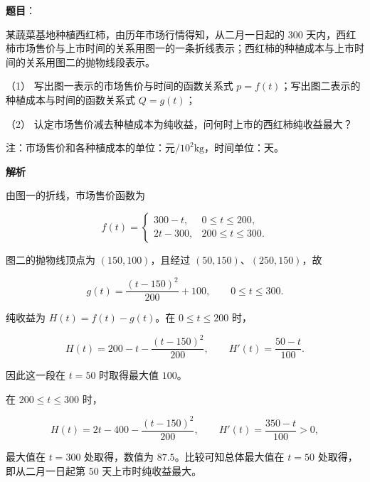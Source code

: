 \begin{answer}

\textbf{题目}：

某蔬菜基地种植西红柿，由历年市场行情得知，从二月一日起的 300 天内，西红柿市场售价与上市时间的关系用图一的一条折线表示；西红柿的种植成本与上市时间的关系用图二的抛物线段表示。

（1） 写出图一表示的市场售价与时间的函数关系式 $p=f(t)$；写出图二表示的种植成本与时间的函数关系式 $Q=g(t)$；

（2） 认定市场售价减去种植成本为纯收益，问何时上市的西红柿纯收益最大？

注：市场售价和各种植成本的单位：元/$10^2\mathrm{kg}$，时间单位：天。
\nopagebreak[4]
\begin{center}\end{center}
\nopagebreak[4]
\textbf{解析}


由图一的折线，市场售价函数为

\nopagebreak[4]
\[
f(t)=
\begin{cases}
300-t,&0\le t\le200,\\
2t-300,&200\le t\le300.
\end{cases}
\]

图二的抛物线顶点为 $(150,100)$，且经过 $(50,150)$、$(250,150)$，故

\nopagebreak[4]
\[
g(t)=\frac{(t-150)^2}{200}+100,
\qquad0\le t\le300.
\]


纯收益为 $H(t)=f(t)-g(t)$。在 $0\le t\le200$ 时，

\nopagebreak[4]
\[
H(t)=200-t-\frac{(t-150)^2}{200},
\qquad
H'(t)=\frac{50-t}{100}.
\]

因此这一段在 $t=50$ 时取得最大值 $100$。

在 $200\le t\le300$ 时，

\nopagebreak[4]
\[
H(t)=2t-400-\frac{(t-150)^2}{200},
\qquad
H'(t)=\frac{350-t}{100}>0,
\]

最大值在 $t=300$ 处取得，数值为 $87.5$。比较可知总体最大值在 $t=50$ 处取得，即从二月一日起第 50 天上市时纯收益最大。



\end{answer}
